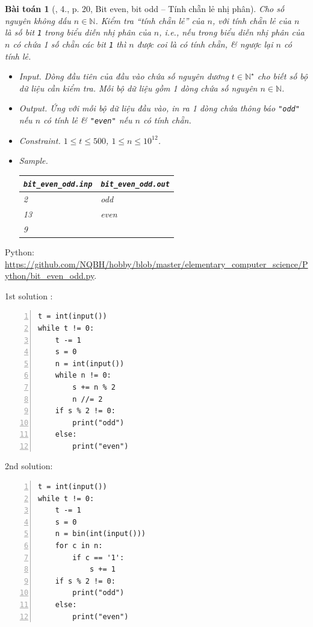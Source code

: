\documentclass{article}
\newtheorem{baitoan}{Bài toán}
\begin{document}
\begin{baitoan}[\cite{Duc_200_BT_Python}, 4., p. 20, Bit even, bit odd -- Tính chẵn lẻ nhị phân]
	Cho số nguyên không dấu $n\in\mathbb{N}$. Kiểm tra ``tính chẵn lẻ'' của $n$, với \emph{tính chẵn lẻ} của $n$ là số bit {\tt1} trong biểu diễn nhị phân của $n$, i.e., nếu trong biểu diễn nhị phân của $n$ có chứa 1 số chẵn các bit {\tt1} thì $n$ được coi là có tính chẵn, \& ngược lại $n$ có tính lẻ.
	\begin{itemize}
		\item {\sf Input.} Dòng đầu tiên của đầu vào chứa số nguyên dương $t\in\mathbb{N}^\star$ cho biết số bộ dữ liệu cần kiểm tra. Mỗi bộ dữ liệu gồm 1 dòng chứa số nguyên $n\in\mathbb{N}$.
		\item {\sf Output.} Ứng với mỗi bộ dữ liệu đầu vào, in ra 1 dòng chứa thông báo {\tt"odd"} nếu $n$ có tính lẻ \& {\tt"even"} nếu $n$ có tính chẵn.
		\item {\sf Constraint.} $1\le t\le500$, $1\le n\le10^{12}$.
		\item {\sf Sample.}
		\begin{table}[H]
			\centering
			\begin{tabular}{|l|l|}
				\hline
				\verb|bit_even_odd.inp| & \verb|bit_even_odd.out| \\
				\hline
				2 & odd \\
				13 & even \\
				9 & \\
				\hline
			\end{tabular}
		\end{table}
	\end{itemize}
\end{baitoan}
\noindent Python: \url{https://github.com/NQBH/hobby/blob/master/elementary_computer_science/Python/bit_even_odd.py}.
\begin{multicols}{2}
	1st solution \cite[4., p. 204]{Duc_200_BT_Python}:
\begin{Verbatim}[numbers=left,xleftmargin=5mm]
t = int(input())
while t != 0:
    t -= 1
    s = 0
    n = int(input())
    while n != 0:
        s += n % 2
        n //= 2
    if s % 2 != 0:
        print("odd")
    else:
        print("even")
\end{Verbatim}
\columnbreak
2nd solution:
\begin{Verbatim}[numbers=left,xleftmargin=5mm]
t = int(input())
while t != 0:
    t -= 1
    s = 0
    n = bin(int(input()))
    for c in n:
        if c == '1':
            s += 1
    if s % 2 != 0:
        print("odd")
    else:
        print("even")
\end{Verbatim}
\end{multicols}
\end{document}
